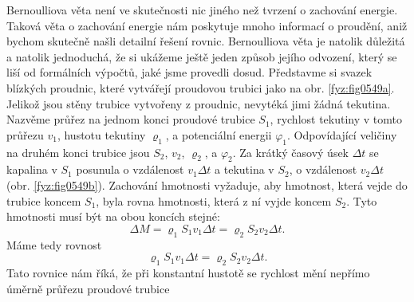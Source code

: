     Bernoulliova věta není ve skutečnosti nic jiného než tvrzení o zachování energie. Taková věta o 
    zachování energie nám poskytuje mnoho informací o proudění, aniž bychom skutečně našli detailní 
    řešení rovnic. Bernoulliova věta je natolik důležitá a natolik jednoduchá, že si ukážeme ještě 
    jeden způsob jejího odvození, který se liší od formálních výpočtů, jaké jsme provedli dosud. 
    Představme si svazek blízkých proudnic, které vytvářejí proudovou trubici jako na obr. 
    \ref{fyz:fig0549a}. Jelikož jsou stěny trubice vytvořeny z proudnic, nevytéká jimi žádná 
    tekutina. Nazvěme průřez na jednom konci proudové trubice \(S_1\), rychlost tekutiny v tomto 
    průřezu \(v_1\), hustotu tekutiny \(\varrho_1\), a potenciální energii  \(\varphi_1\). 
    Odpovídající veličiny na druhém konci trubice jsou \(S_2\), \(v_2\), \(\varrho_2\), a 
    \(\varphi_2\). Za krátký časový úsek \(\Delta t\) se kapalina v \(S_1\) posunula o vzdálenost 
    \(v_1\Delta t\) a tekutina v \(S_2\), o vzdálenost \(v_2\Delta t\) (obr. \ref{fyz:fig0549b}). 
    Zachování hmotnosti vyžaduje, aby hmotnost, která vejde do trubice koncem \(S_1\), byla rovna 
    hmotnosti, která z ní vyjde koncem \(S_2\). Tyto hmotnosti musí být na obou koncích stejné:
    \begin{equation*}
      \Delta M = \varrho_1S_1v_1\Delta t = \varrho_2S_2v_2\Delta t.
    \end{equation*}
    Máme tedy rovnost
    \begin{equation}\label{fyz:eq561}
      \varrho_1S_1v_1\Delta t = \varrho_2S_2v_2\Delta t.
    \end{equation}
    Tato rovnice nám říká, že při konstantní hustotě se rychlost mění nepřímo úměrně průřezu 
    proudové trubice
    
